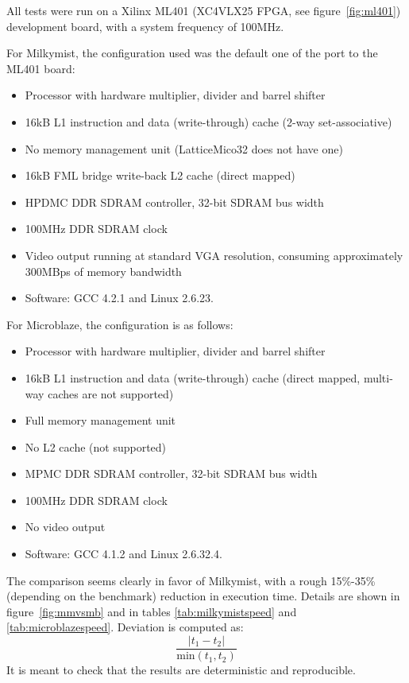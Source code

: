 \documentclass[a4paper,11pt]{kthesis}
\begin{document}
All tests were run on a Xilinx ML401 (XC4VLX25 FPGA, see figure~\ref{fig:ml401}) development board, with a system frequency of 100MHz.

For Milkymist, the configuration used was the default one of the port to the ML401 board:
\begin{itemize}
\item Processor with hardware multiplier, divider and barrel shifter
\item 16kB L1 instruction and data (write-through) cache (2-way set-associative)
\item No memory management unit (LatticeMico32 does not have one)
\item 16kB FML bridge write-back L2 cache (direct mapped)
\item HPDMC DDR SDRAM controller, 32-bit SDRAM bus width
\item 100MHz DDR SDRAM clock
\item Video output running at standard VGA resolution, consuming approximately 300MBps of memory bandwidth
\item Software: GCC 4.2.1 and Linux 2.6.23.
\end{itemize}

For Microblaze, the configuration is as follows:
\begin{itemize}
\item Processor with hardware multiplier, divider and barrel shifter
\item 16kB L1 instruction and data (write-through) cache (direct mapped, multi-way caches are not supported)
\item Full memory management unit
\item No L2 cache (not supported)
\item MPMC DDR SDRAM controller, 32-bit SDRAM bus width
\item 100MHz DDR SDRAM clock
\item No video output
\item Software: GCC 4.1.2 and Linux 2.6.32.4.
\end{itemize}

The comparison seems clearly in favor of Milkymist, with a rough 15\%-35\% (depending on the benchmark) reduction in execution time. Details are shown in figure~\ref{fig:mmvsmb} and in tables \ref{tab:milkymistspeed} and \ref{tab:microblazespeed}. Deviation is computed as:
\begin{equation}
\frac{|t_{1}-t_{2}|}{\textrm{min}(t_{1}, t_{2})}
\end{equation}
It is meant to check that the results are deterministic and reproducible.
\end{document}
